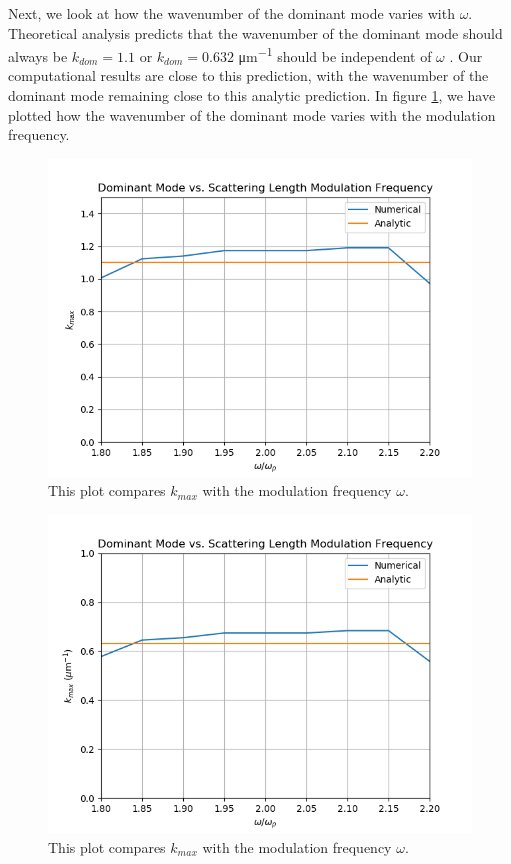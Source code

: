 \documentclass[12]{article}
\begin{document}
Next, we look at how the wavenumber of the dominant mode varies with $\omega$. Theoretical analysis predicts that the wavenumber of the dominant mode should always be $k_{dom} = 1.1$ or $k_{dom} = 0.632$ \si{\micro\meter^{-1}} should be independent of $\omega$ \cite{mustafa}. Our computational results are close to this prediction, with the wavenumber of the dominant mode remaining close to this analytic prediction. In figure \ref{fig:kmaxNat}, we have plotted how the wavenumber of the dominant mode varies with the modulation frequency. 

\begin{figure}[H]
\centering
\includegraphics[scale=0.9]{kmaxNatUnits}
\caption{This plot compares $k_{max}$ with the modulation frequency $\omega$.}
\label{fig:kmaxNat}
\end{figure}

\begin{figure}[b]
\centering
\includegraphics[scale=0.9]{kmaxExpUnits}
\caption{This plot compares $k_{max}$ with the modulation frequency $\omega$.}
\label{fig:kmaxExp}
\end{figure}
\end{document}
